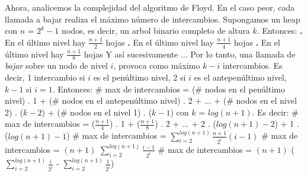 \documentclass[10pt,a4paper]{article}
\begin{document}
Ahora, analicemos la complejidad del algoritmo de Floyd.
\newline
\newline
En el caso peor, cada llamada a bajar realiza el máximo número de intercambios.
\newline
\newline
Supongamos un heap con $n$ = $2^{k} - 1$ nodos, es decir, un arbol binario completo de altura $k$. Entonces:
\newline
\newline
\textbf{.} En el último nivel hay $\displaystyle \frac{n+1}{2}$ hojas
\newline
\newline
\textbf{.} En el último nivel hay $\displaystyle \frac{n+1}{4}$ hojas
\newline
\newline
\textbf{.} En el último nivel hay $\displaystyle \frac{n+1}{8}$ hojas
\newline
\newline
Y así sucesivamente ...
\newline
\newline
Por lo tanto, una llamada de \textit{bajar} sobre un nodo de nivel $i$, provoca como máximo $k-i$ intercambios. Es decir, 1 intercambio si $i$ es el penúltimo nivel, 2 si $i$ es el antepenúltimo nivel, $k-1$ si $i=1$. Entonces:
\newline
\newline
\# max de intercambios = (\# nodos en el penúltimo nivel) . 1 + (\# nodos en el antepenúltimo nivel) . 2 + ... + (\# nodos en el nivel 2) . ($k-2$) + (\# nodos en el nivel 1) . ($k-1$) con $k$ = $log(n+1)$. Es decir: 
\newline
\newline
\# max de intercambios = ($\displaystyle \frac{n+1}{4}$) . 1 + ($\displaystyle \frac{n+1}{8}$) . 2 + ... + 2 . ($log(n+1) - 2$) + 1 . ($log(n+1) - 1$) 
\newline
\newline
\# max de intercambios = $\displaystyle \sum_{i=2}^{log(n+1)} \displaystyle \frac{n+1}{2^{i}}(i-1)$
\newline
\newline
\# max de intercambios = $(n+1)$ $\displaystyle \sum_{i=2}^{log(n+1)} \displaystyle \frac{i-1}{2^{i}}$
\newline
\newline
\# max de intercambios = $(n+1)$ ( $\displaystyle \sum_{i=2}^{log(n+1)} \displaystyle \frac{i}{2^{i}}$ - $\displaystyle \sum_{i=2}^{log(n+1)} \displaystyle \frac{1}{2^{i}}$)
\end{document}
